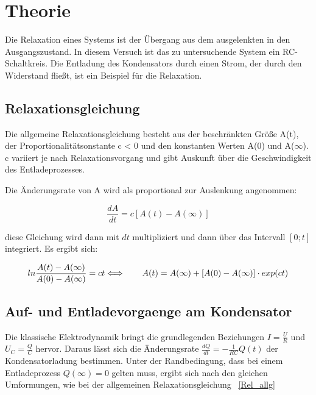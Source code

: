 \section{Theorie}
\label{sec:Theorie}

Die Relaxation eines Systems ist der Übergang aus dem ausgelenkten in den Ausgangszustand.
In diesem Versuch ist das zu untersuchende System ein RC-Schaltkreis.
Die Entladung des Kondensators durch einen Strom, der durch den Widerstand fließt, 
ist ein Beispiel für die Relaxation.

\subsection{Relaxationsgleichung}
\label{subsec:Die Relaxationsgleichung}

Die allgemeine Relaxationsgleichung besteht aus der beschränkten Größe A(t), der Proportionalitätsonstante c < 0 
und den konstanten
Werten A(0) und A($\infty$).
c variiert je nach Relaxationsvorgang und gibt Auskunft über die Geschwindigkeit des Entladeprozesses.

Die Änderungsrate von A wird als proportional zur Auslenkung angenommen:

\begin{equation} 
    \label{Rel_allg}
\frac{dA}{dt} = c[A(t)-A(\infty)]
\end{equation}

diese Gleichung wird dann mit $dt$ multipliziert und dann über das Intervall $[0; t]$ integriert. 
Es ergibt sich:

\begin{equation} 
    \label{Rel_RC}
ln\frac{A(t)-A(\infty)}{A(0)-A(\infty)} = ct \\
\Longleftrightarrow\qquad A(t) = A(\infty) + [A(0)-A(\infty)] \cdot exp(ct)
\end{equation}


\subsection{Auf- und Entladevorgaenge am Kondensator}
\label{subsec:Entladevorgaenge am Kondensator}

Die klassische Elektrodynamik bringt die grundlegenden Beziehungen $I = \frac{U}{R}$ und $U_C = \frac{Q}{C}$ 
hervor.
Daraus lässt sich die Änderungsrate $\frac{dQ}{dt} = -\frac{1}{RC}Q(t)$ der Kondensatorladung bestimmen. 
Unter der Randbedingung, dass bei einem Entladeprozess $Q(\infty) = 0$ gelten muss, ergibt sich nach den gleichen
Umformungen, wie bei der allgemeinen Relaxationsgleichung ~\eqref{Rel_allg}

